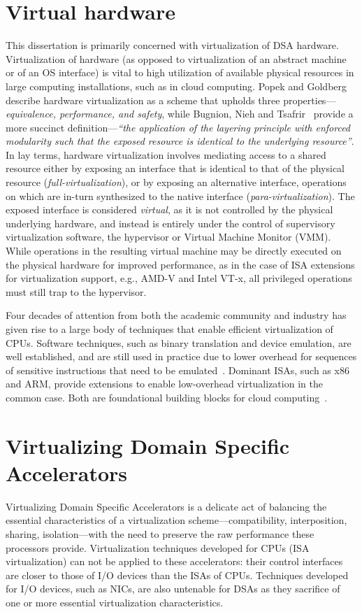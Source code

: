 \section{Virtual hardware}
This dissertation is primarily concerned with virtualization of DSA hardware.
Virtualization of hardware (as opposed to virtualization of an abstract machine
or of an OS interface) is vital to high utilization of available physical
resources in large computing installations, such as in cloud computing.
Popek and Goldberg describe hardware virtualization as a scheme that upholds
three properties---\emph{equivalence, performance, and safety}, while Bugnion,
Nieh and Tsafrir~\cite{ bugnion-nieh-tsafrir} provide a more succinct
definition---\textit{``the application of the layering principle with enforced
modularity such that the exposed resource is identical to the underlying
resource''}.
In lay terms, hardware virtualization involves mediating access to a shared
resource either by exposing an interface that is identical to that of the
physical resource (\emph{full-virtualization}), or by exposing an alternative
interface, operations on which are in-turn synthesized to the native interface
(\emph{para-virtualization}).
The exposed interface is considered \emph{virtual}, as it is not controlled by
the physical underlying hardware, and instead is entirely under the control of
supervisory virtualization software, the hypervisor or Virtual Machine Monitor
(VMM). While operations in the resulting virtual machine may be directly
executed on the physical hardware for improved performance, as in the case of
ISA extensions for virtualization support, e.g., AMD-V and Intel VT-x, all
privileged operations must still trap to the hypervisor.

Four decades of attention from both the academic community and industry has
given rise to a large body of techniques that enable efficient virtualization
of CPUs. Software techniques, such as binary translation and device emulation,
are well established, and are still used in practice due to lower overhead for
sequences of sensitive instructions that need to be emulated~\cite{
vmware-esx-bt-plus-vtx}. Dominant ISAs, such as x86 and ARM, provide extensions
to enable low-overhead virtualization in the common case. Both are foundational
building blocks for cloud computing~\cite{amazon_ec2}.

\section{Virtualizing Domain Specific Accelerators}
Virtualizing Domain Specific Accelerators is a delicate act of balancing the
essential characteristics of a virtualization scheme---compatibility,
interposition, sharing, isolation---with the need to preserve the raw
performance these processors provide.
Virtualization techniques developed for CPUs (ISA virtualization) can not be
applied to these accelerators: their control interfaces are closer to those of
I/O devices than the ISAs of CPUs. Techniques developed for I/O devices, such
as NICs, are also untenable for DSAs as they sacrifice of one or more
essential virtualization characteristics.

